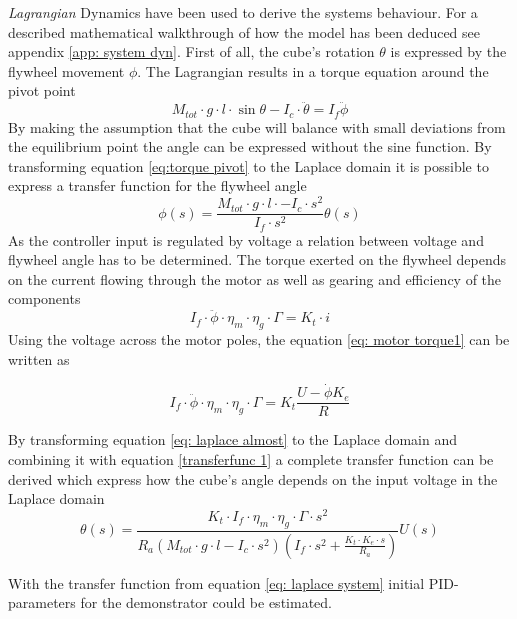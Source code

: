 \documentclass[a4paper,11pt]{kth-mag}
\begin{document}
\emph{Lagrangian} Dynamics have been used to derive the systems behaviour. For a described mathematical walkthrough of how the model has been deduced see appendix \ref{app: system dyn}. First of all, the cube's rotation $\theta$ is expressed by the flywheel movement $\phi$. The Lagrangian  results in a torque equation around the pivot point
\begin{equation} \label{eq:torque pivot}
M_{tot} \cdot g \cdot l \cdot \sin \theta - I_c \cdot \ddot{\theta} = I_f \ddot{\phi}
\end{equation}
By making the assumption that the cube will balance with small deviations from the equilibrium point the angle can be expressed without the sine function. By transforming equation \ref{eq:torque pivot} to the Laplace domain it is possible to express a transfer function for the flywheel angle
\begin{equation} \label{transferfunc 1}
\phi (s) = \frac{M_{tot} \cdot g \cdot l \cdot-I_c \cdot s^2}{I_f \cdot s^2}  \theta(s)
\end{equation}
As the controller input is regulated by voltage a relation between voltage and flywheel angle has to be determined. The torque exerted on the flywheel depends on the current flowing through the motor as well as gearing and efficiency of the components
\begin{equation} \label{eq: motor torque1}
I_f \cdot \ddot{\phi} \cdot \eta_m \cdot \eta_g \cdot \Gamma = K_t \cdot i
\end{equation}
Using the voltage across the motor poles, the equation \ref{eq: motor torque1} can be written as

\begin{equation} \label{eq: laplace almost}
I_f \cdot \ddot{\phi} \cdot \eta_m \cdot \eta_g \cdot \Gamma = K_t \frac{U - \dot{\phi} K_e}{R}
\end{equation} 

By transforming equation \ref{eq: laplace almost} to the Laplace domain and combining it with equation \ref{transferfunc 1} a complete transfer function can be derived which express how the cube's angle depends on the input voltage in the Laplace domain
\begin{equation} \label{eq: laplace system}
\theta(s) = \frac{K_t \cdot I_f \cdot \eta_m \cdot \eta_g \cdot \Gamma \cdot s^2}{R_a (M_{tot} \cdot g \cdot l - I_c \cdot s^2)(I_f \cdot s^2 + \frac{K_t \cdot K_e \cdot s}{R_a})} U(s)
\end{equation}

With the transfer function from equation \ref{eq: laplace system} initial PID-parameters for the demonstrator could be estimated.
\end{document}
